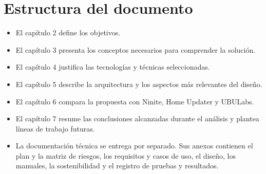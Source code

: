 \section{Estructura del documento}

\begin{itemize}
	\item El capítulo 2 define los objetivos.
	\item El capítulo 3 presenta los conceptos necesarios para comprender la solución.
	\item El capítulo 4 justifica las tecnologías y técnicas seleccionadas.
	\item El capítulo 5 describe la arquitectura y los aspectos más relevantes del diseño.
	\item El capítulo 6 compara la propuesta con Ninite, Home Updater y UBULabs.
	\item El capítulo 7 resume las conclusiones alcanzadas durante el análisis y plantea líneas de trabajo futuras.
	\item La documentación técnica se entrega por separado. Sus anexos contienen el plan y la matriz de riesgos, los requisitos y casos de uso, el diseño, los manuales, la sostenibilidad y el registro de pruebas y resultados.
\end{itemize}

